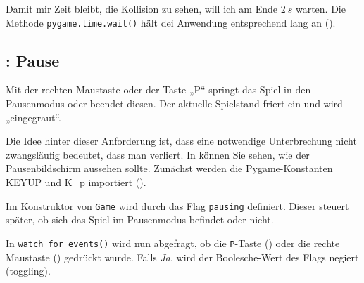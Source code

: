 
Damit mir Zeit bleibt, die Kollision zu sehen, will ich am Ende $2~s$ warten. Die Methode \texttt{pygame.time.wait()} hält dei Anwendung entsprechend lang an ().





\subsection{: Pause}
 Mit der rechten Maustaste oder der Taste „P“ springt das Spiel in den Pausenmodus oder beendet diesen. Der aktuelle Spielstand friert ein und wird „eingegraut“. 
\er

Die Idee hinter dieser Anforderung ist, dass eine notwendige Unterbrechung nicht zwangsläufig bedeutet, dass man verliert. In  können Sie sehen, wie der Pausenbildschirm aussehen sollte.
Zunächst werden die Pygame-Konstanten KEYUP und K\_p importiert ().



Im Konstruktor von \texttt{Game} wird durch das Flag \texttt{pausing} definiert. Dieser steuert später, ob sich das Spiel im Pausenmodus befindet oder nicht.



In \texttt{watch\_for\_events()} wird nun abgefragt, ob die \texttt{P}-Taste () oder die rechte Maustaste () gedrückt wurde. Falls \emph{Ja}, wird der Boolesche-Wert des Flags negiert (\gls{toggling}).

